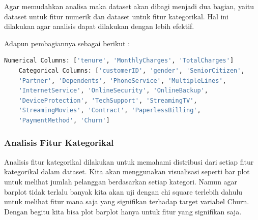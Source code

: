Agar memudahkan analisa maka dataset akan dibagi menjadi dua bagian, yaitu dataset untuk fitur numerik dan dataset untuk fitur kategorikal. Hal ini dilakukan agar analisis dapat dilakukan dengan lebih efektif.

Adapun pembagiannya sebagai berikut :
\begin{lstlisting}[language=Python, caption=Memisahkan Fitur Numerik dan Kategorikal]
    Numerical Columns: ['tenure', 'MonthlyCharges', 'TotalCharges']
    Categorical Columns: ['customerID', 'gender', 'SeniorCitizen', 
    'Partner', 'Dependents', 'PhoneService', 'MultipleLines', 
    'InternetService', 'OnlineSecurity', 'OnlineBackup', 
    'DeviceProtection', 'TechSupport', 'StreamingTV', 
    'StreamingMovies', 'Contract', 'PaperlessBilling', 
    'PaymentMethod', 'Churn']
\end{lstlisting}

\subsubsection{Analisis Fitur Kategorikal}
Analisis fitur kategorikal dilakukan untuk memahami distribusi dari setiap fitur kategorikal dalam dataset. Kita akan menggunakan visualisasi seperti bar plot untuk melihat jumlah pelanggan berdasarkan setiap kategori. Namun agar barplot tidak terlalu banyak kita akan uji dengan chi square terlebih dahulu untuk melihat fitur mana saja yang signifikan terhadap target variabel Churn. Dengan begitu kita bisa plot barplot hanya untuk fitur yang signifikan saja.



